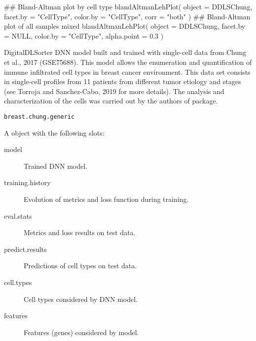 \documentclass[a4paper]{book}
\begin{document}
%
\begin{SeeAlso}\relax
{} 
 
\end{SeeAlso}
%
\begin{Examples}
\begin{ExampleCode}
## Bland-Altman plot by cell type
blandAltmanLehPlot(
  object = DDLSChung,
  facet.by = "CellType",
  color.by = "CellType",
  corr = "both"
)
## Bland-Altman plot of all samples mixed
blandAltmanLehPlot(
  object = DDLSChung,
  facet.by = NULL,
  color.by = "CellType",
  alpha.point = 0.3
)
\end{ExampleCode}
\end{Examples}
%
\begin{Description}\relax
DigitalDLSorter DNN model built and trained with single-cell data from Chung
et al., 2017 (GSE75688). This model allows the enumeration and quantification
of immune infiltrated cell types in breast cancer environment. This data set
consists in single-cell profiles from 11 patients from different tumor
etiology and stages (see Torroja and Sanchez-Cabo, 2019 for more details).
The analysis and characterization of the cells was carried out by the authors
of  package.
\end{Description}
%
\begin{Usage}
\begin{verbatim}
breast.chung.generic
\end{verbatim}
\end{Usage}
%
\begin{Format}
A  object with the following slots:
\begin{description}
 \item[model] Trained DNN model.
\item[training.history] Evolution of metrics and loss function during
training.\item[eval.stats] Metrics and loss results on test data.
\item[predict.results] Predictions of cell types on test data.
\item[cell.types] Cell types considered by DNN model.
\item[features] Features (genes) considered by model.
\end{description}

\end{Format}
\end{document}
